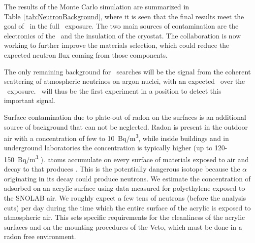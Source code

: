 The results of the Monte Carlo simulation are summarized in Table~\ref{tab:NeutronBackground}, where it is seen that the final results meet the goal of \BackgroundFreeRequirement\ in the full \DSkExtendedExposure\ exposure.  The two main sources of contamination are the electronics of the \SiPMs\ and the insulation of the cryostat.  The collaboration is now working to further improve the materials selection, which could reduce the expected neutron flux coming from those components.

The only remaining background for \WIMP\ searches will be the signal from the coherent scattering of atmospheric neutrinos on argon nuclei, with an expected \DSkNuInducedBackgroundExtendedExposureUnit\ over the \DSkExtendedExposure\ exposure.  \DSks\ will thus be the first experiment in a position to detect this important signal. 

Surface contamination due to plate-out of radon on the surfaces is an additional source of background that can not be neglected. Radon is present in the outdoor air with a concentration of few to \SI{10}{Bq/m^3}, while inside buildings and in underground laboratories the concentration is typically higher (up to 120-\SI{150}{Bq/m^3} ).  atoms accumulate on every surface of materials exposed to air and decay to  that produces . This is the potentially dangerous isotope because the $\alpha$ originating in its decay could produce neutrons. We estimate the concentration of  adsorbed on an acrylic surface using data measured for polyethylene exposed to the SNOLAB air.  We roughly expect a few tens of neutrons (before the analysis cuts) per day during the time which the entire surface of the acrylic is exposed to atmospheric air. This sets specific requirements for the cleanliness of the acrylic surfaces and on the mounting procedures of the Veto, which must be done in a radon free environment.